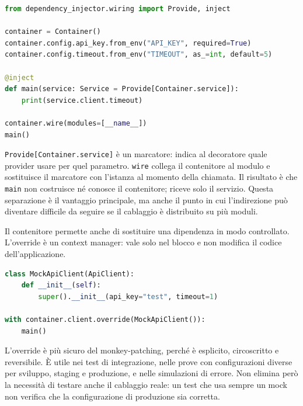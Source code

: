 \documentclass[12pt]{extarticle}
\begin{document}
\begin{lstlisting}[language=Python]
from dependency_injector.wiring import Provide, inject

container = Container()
container.config.api_key.from_env("API_KEY", required=True)
container.config.timeout.from_env("TIMEOUT", as_=int, default=5)

@inject
def main(service: Service = Provide[Container.service]):
    print(service.client.timeout)

container.wire(modules=[__name__])
main()
\end{lstlisting}

\noindent \texttt{Provide[Container.service]} è un marcatore: indica al decoratore quale provider usare per quel parametro. \texttt{wire} collega il contenitore al modulo e sostituisce il marcatore con l'istanza al momento della chiamata. Il risultato è che \texttt{main} non costruisce né conosce il contenitore; riceve solo il servizio. Questa separazione è il vantaggio principale, ma anche il punto in cui l'indirezione può diventare difficile da seguire se il cablaggio è distribuito su più moduli.

\noindent Il contenitore permette anche di sostituire una dipendenza in modo controllato. L'override è un context manager: vale solo nel blocco e non modifica il codice dell'applicazione.

\begin{lstlisting}[language=Python]
class MockApiClient(ApiClient):
    def __init__(self):
        super().__init__(api_key="test", timeout=1)

with container.client.override(MockApiClient()):
    main()
\end{lstlisting}

\noindent L'override è più sicuro del monkey-patching, perché è esplicito, circoscritto e reversibile. È utile nei test di integrazione, nelle prove con configurazioni diverse per sviluppo, staging e produzione, e nelle simulazioni di errore. Non elimina però la necessità di testare anche il cablaggio reale: un test che usa sempre un mock non verifica che la configurazione di produzione sia corretta.

\begin{center}
\end{center}
\end{document}
